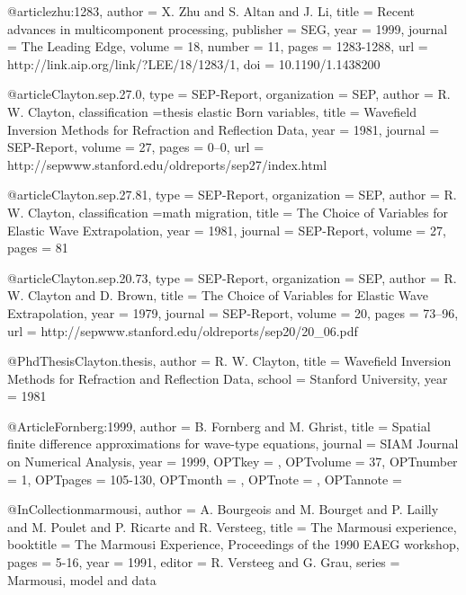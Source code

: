 @article{zhu:1283,
  author =	 {X. Zhu and S. Altan and J. Li},
  title =	 {Recent advances in multicomponent processing},
  publisher =	 {SEG},
  year =	 1999,
  journal =	 {The Leading Edge},
  volume =	 18,
  number =	 11,
  pages =	 {1283-1288},
  url =		 {http://link.aip.org/link/?LEE/18/1283/1},
  doi =		 {10.1190/1.1438200}
}

@article{Clayton.sep.27.0,
  type =	 {SEP-Report},
  organization = {SEP},
  author =	 {R. W. Clayton},
  classification ={thesis elastic {Born} variables},
  title =	 {Wavefield Inversion Methods for Refraction and
                  Reflection Data},
  year =	 1981,
  journal =	 {SEP-Report},
  volume =	 27,
  pages =	 {0--0},
  url =
                  {http://sepwww.stanford.edu/oldreports/sep27/index.html}
}

@article{Clayton.sep.27.81,
  type =	 {SEP-Report},
  organization = {SEP},
  author =	 {R. W. Clayton},
  classification ={math migration},
  title =	 {The Choice of Variables for Elastic Wave
                  Extrapolation},
  year =	 1981,
  journal =	 {SEP-Report},
  volume =	 27,
  pages =	 81
}

@article{Clayton.sep.20.73,
  type =	 {SEP-Report},
  organization = {SEP},
  author =	 {R. W. Clayton and D. Brown},
  title =	 {The Choice of Variables for Elastic Wave
                  Extrapolation},
  year =	 1979,
  journal =	 {SEP-Report},
  volume =	 20,
  pages =	 {73--96},
  url =
                  {http://sepwww.stanford.edu/oldreports/sep20/20_06.pdf}
}

@PhdThesis{Clayton.thesis,
  author =	 {R. W. Clayton},
  title =	 {Wavefield Inversion Methods for Refraction and
                  Reflection Data},
  school =	 {Stanford University},
  year =	 1981
}

@Article{Fornberg:1999,
  author = 	 {B. Fornberg and M. Ghrist},
  title = 	 {Spatial finite difference approximations for
                  wave-type equations},
  journal = 	 {SIAM Journal on Numerical Analysis},
  year = 	 {1999},
  OPTkey = 	 {},
  OPTvolume = 	 {37},
  OPTnumber = 	 {1},
  OPTpages = 	 {105-130},
  OPTmonth = 	 {},
  OPTnote = 	 {},
  OPTannote = 	 {}
}

@InCollection{marmousi,
  author =	 {A. Bourgeois and M. Bourget and P. Lailly and
                  M. Poulet and P. Ricarte and R. Versteeg},
  title =	 {The {M}armousi experience},
  booktitle =	 {The Marmousi Experience, Proceedings of the 1990
                  EAEG workshop},
  pages =	 {5-16},
  year =	 1991,
  editor =	 {R. Versteeg and G. Grau},
  series =	 {Marmousi, model and data}
}

